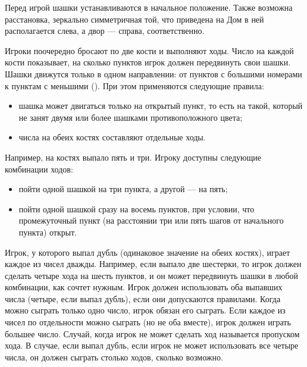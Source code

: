 Перед игрой шашки устанавливаются в начальное положение. Также возможна расстановка, зеркально симметричная той, что приведена на  Дом в ней располагается слева, а двор --- справа, соответственно.


\pagebreak

Игроки поочередно бросают по две кости и выполняют ходы. Число на каждой кости показывает, на сколько пунктов игрок должен передвинуть свои шашки. Шашки движутся только в одном направлении: от пунктов с большими номерами к пунктам с меньшими (). При этом применяются следующие правила:
\begin{itemize}
    \item шашка может двигаться только на открытый пункт, то есть на такой, который не занят двумя или более шашками противоположного цвета;
    \item числа на обеих костях составляют отдельные ходы.
\end{itemize}


\pagebreak

Например, на костях выпало пять и три. Игроку доступны следующие комбинации ходов:
\begin{itemize}
    \item пойти одной шашкой на три пункта, а другой --- на пять;
    \item пойти одной шашкой сразу на восемь пунктов, при условии, что промежуточный пункт (на расстоянии три или пять шагов от начального пункта) открыт.
\end{itemize}

Игрок, у которого выпал дубль (одинаковое значение на обеих костях), играет каждое из чисел дважды. Например, если выпало две шестерки, то игрок должен сделать четыре хода на шесть пунктов, и он может передвинуть шашки в любой комбинации, как сочтет нужным. Игрок должен использовать оба выпавших числа (четыре, если выпал дубль), если они допускаются правилами. Когда можно сыграть только одно число, игрок обязан его сыграть. Если каждое из чисел по отдельности можно сыграть (но не оба вместе), игрок должен играть большее число. Случай, когда игрок не может сделать ход называется пропуском хода. В случае, если выпал дубль, если игрок не может использовать все четыре числа, он должен сыграть столько ходов, сколько возможно.

